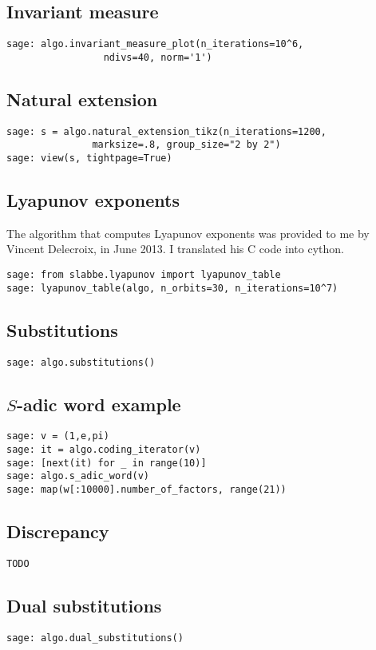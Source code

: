 \subsection{Invariant measure}
\begin{verbatim}
sage: algo.invariant_measure_plot(n_iterations=10^6,
                 ndivs=40, norm='1')
\end{verbatim}
\subsection{Natural extension}
\begin{verbatim}
sage: s = algo.natural_extension_tikz(n_iterations=1200, 
               marksize=.8, group_size="2 by 2")
sage: view(s, tightpage=True)
\end{verbatim}
\subsection{Lyapunov exponents}
The algorithm that computes Lyapunov exponents was provided to me
by Vincent Delecroix, in June 2013. I translated his C code into cython.
\begin{verbatim}
sage: from slabbe.lyapunov import lyapunov_table
sage: lyapunov_table(algo, n_orbits=30, n_iterations=10^7)
\end{verbatim}
\subsection{Substitutions}
\begin{verbatim}
sage: algo.substitutions()
\end{verbatim}
\subsection{$S$-adic word example}
\begin{verbatim}
sage: v = (1,e,pi)
sage: it = algo.coding_iterator(v)
sage: [next(it) for _ in range(10)]
sage: algo.s_adic_word(v)
sage: map(w[:10000].number_of_factors, range(21))  
\end{verbatim}
\subsection{Discrepancy}
\begin{verbatim}
TODO
\end{verbatim}
\subsection{Dual substitutions}
\begin{verbatim}
sage: algo.dual_substitutions()
\end{verbatim}
